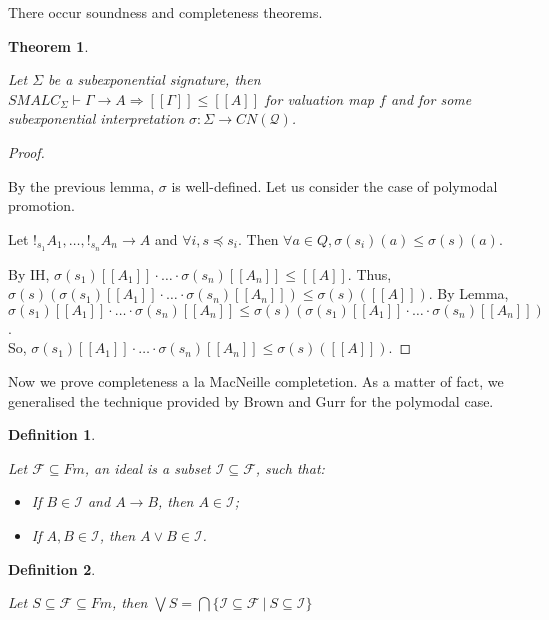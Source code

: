 \documentclass[a4paper]{article}
\theoremstyle{defin}
\newtheorem{defin}{Definition}
\theoremstyle{theorem}
\newtheorem{theorem}{Theorem}
\theoremstyle{prop}
\theoremstyle{lemma}
\theoremstyle{ex}
\theoremstyle{col}
\begin{document}
There occur soundness and completeness theorems.

\begin{theorem}
$ $

  Let $\Sigma$ be a subexponential signature, then
  $SMALC_{\Sigma} \vdash \Gamma \rightarrow A \Rightarrow [\![\Gamma]\!] \leq [\![A]\!]$ for valuation map $f$ and for some subexponential interpretation $\sigma : \Sigma \to CN(\mathcal{Q})$.
\end{theorem}

\begin{proof}
  $ $

By the previous lemma, $\sigma$ is well-defined. Let us consider the case of polymodal promotion.

Let $!_{s_1} A_1, \dots, !_{s_n} A_n \rightarrow A$ and $\forall i, s \preceq s_i$. Then $\forall a \in Q, \sigma(s_i)(a) \leq \sigma(s)(a)$.

By IH, $\sigma(s_1)[\![A_1]\!] \cdot \dots \cdot \sigma(s_n) [\![A_n]\!] \leq [\![A]\!]$. Thus,
$\sigma(s)(\sigma(s_1)[\![A_1]\!] \cdot \dots \cdot \sigma(s_n) [\![A_n]\!]) \leq \sigma(s)([\![A]\!])$. By Lemma,
$\sigma(s_1)[\![A_1]\!] \cdot \dots \cdot \sigma(s_n) [\![A_n]\!] \leq \sigma(s)(\sigma(s_1)[\![A_1]\!] \cdot \dots \cdot
\sigma(s_n) [\![A_n]\!])$. \\
So, $\sigma(s_1)[\![A_1]\!] \cdot \dots \cdot \sigma(s_n) [\![A_n]\!] \leq \sigma(s)([\![A]\!])$.
\end{proof}

Now we prove completeness a la MacNeille completetion. As a matter of fact, we generalised the technique provided by Brown and Gurr for the polymodal case.

\begin{defin}
$ $

  Let $\mathcal{F} \subseteq Fm$, an ideal is a subset $\mathcal{I} \subseteq \mathcal{F}$, such that:

\begin{itemize}
  \item If $B \in \mathcal{I}$ and $A \rightarrow B$, then $A \in \mathcal{I}$;
  \item If $A, B \in \mathcal{I}$, then $A \lor B \in \mathcal{I}$.
\end{itemize}
\end{defin}

\begin{defin}
$ $

  Let $S \subseteq \mathcal{F} \subseteq Fm$,
  then $\bigvee S = \bigcap \{ \mathcal{I} \subseteq \mathcal{F} \: | \: S \subseteq \mathcal{I} \}$
\end{defin}
\end{document}
